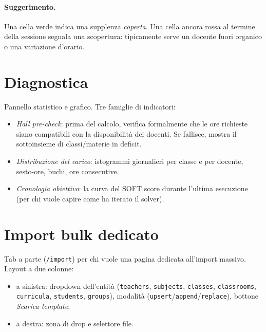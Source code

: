\paragraph{Suggerimento.} Una cella verde indica una supplenza
\emph{coperta}. Una cella ancora rossa al termine della
sessione segnala una scopertura: tipicamente serve un docente
fuori organico o una variazione d'orario.


\section{Diagnostica}
\label{sec:tab_diagnostica}

Pannello statistico e grafico. Tre famiglie di indicatori:

\begin{itemize}
\item \emph{Hall pre-check}: prima del calcolo, verifica
  formalmente che le ore richieste siano compatibili con la
  disponibilit\`a dei docenti. Se fallisce, mostra il
  sottoinsieme di classi/materie in deficit.
\item \emph{Distribuzione del carico}: istogrammi giornalieri
  per classe e per docente, sesto-ore, buchi, ore consecutive.
\item \emph{Cronologia obiettivo}: la curva del SOFT score
  durante l'ultima esecuzione (per chi vuole capire come ha
  iterato il solver).
\end{itemize}


\section{Import bulk dedicato}
\label{sec:tab_import_bulk}

Tab a parte (\texttt{/import}) per chi vuole una pagina
dedicata all'import massivo. Layout a due colonne:

\begin{itemize}
\item a sinistra: dropdown dell'entit\`a (\texttt{teachers},
  \texttt{subjects}, \texttt{classes}, \texttt{classrooms},
  \texttt{curricula}, \texttt{students}, \texttt{groups}),
  modalit\`a (\texttt{upsert}/\texttt{append}/\texttt{replace}),
  bottone \emph{Scarica template};
\item a destra: zona di drop e selettore file.
\end{itemize}

